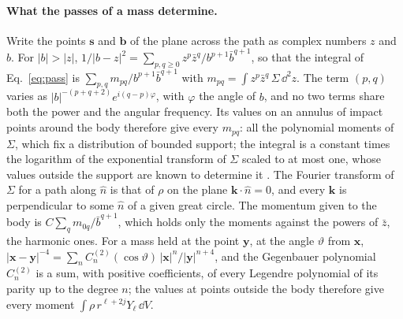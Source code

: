 \paragraph{What the passes of a mass determine.} Write the points $\mathbf s$
and $\mathbf b$ of the plane across the path as complex numbers $z$ and $b$.
For $|b| > |z|$,
$1/|b - z|^2 = \sum_{p,q\ge0}z^p\bar z^q/b^{p+1}\bar b^{q+1}$, so that the
integral of Eq.~\eqref{eq:pass} is $\sum_{p,q}m_{pq}/b^{p+1}\bar b^{q+1}$ with
$m_{pq} = \int z^p\bar z^q\,\Sigma\,\dd^2z$. The term $(p, q)$ varies as
$|b|^{-(p+q+2)}e^{i(q-p)\varphi}$, with $\varphi$ the angle of $b$, and no two
terms share both the power and the angular frequency. Its values on an annulus
of impact points around the body therefore give every $m_{pq}$: all the
polynomial moments of $\Sigma$, which fix a distribution of bounded support;
the integral is a constant times the logarithm of the exponential transform of
$\Sigma$ scaled to at most one, whose
values outside the support are known to determine it
\cite{GustafssonPutinar2017}.
The Fourier transform of $\Sigma$ for a path along $\hat n$ is that of $\rho$ on
the plane $\mathbf k\cdot\hat n = 0$, and every $\mathbf k$ is perpendicular to
some $\hat n$ of a given great circle. The momentum given to the body is
$C\sum_q m_{0q}/\bar b^{q+1}$, which holds only the moments against the powers
of $\bar z$, the harmonic ones. For a mass held at the point $\mathbf y$, at
the angle $\vartheta$ from $\mathbf x$,
$|\mathbf x - \mathbf y|^{-4} = \sum_n C^{(2)}_n(\cos\vartheta)\,|\mathbf x|^n/|\mathbf y|^{n+4}$,
and the Gegenbauer polynomial $C^{(2)}_n$ is a sum, with positive
coefficients, of every Legendre polynomial of its parity up to the degree $n$;
the values at points outside the body therefore give every moment
$\int\rho\,r^{\ell+2j}Y_\ell\,\dd V$.

